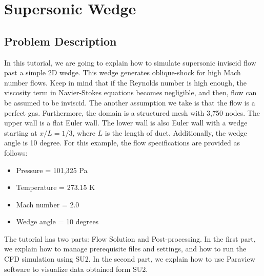 \chapter{Supersonic Wedge}
\section{Problem Description}
In this tutorial, we are going to explain how to simulate supersonic inviscid flow past a simple 2D wedge. This wedge generates oblique-shock for high Mach number flows. Keep in mind that if the Reynolds number is high enough, the viscosity term in Navier-Stokes equations becomes negligible, and then, flow can be assumed to be inviscid. The another assumption we take is that the flow is a perfect gas. Furthermore, the domain is a structured mesh with 3,750 nodes. The upper wall is a flat Euler wall. The lower wall is also Euler wall with a wedge starting at $x/L=1/3$, where $L$ is the length of duct. Additionally, the wedge angle is 10 degree. For this example, the flow specifications are provided as follows:
\begin{itemize}
    \item Pressure = 101,325 Pa
    \item Temperature = 273.15 K
    \item Mach number = 2.0
    \item Wedge angle = 10 degrees
\end{itemize}
The tutorial has two parts: Flow Solution and Post-processing. In the first part, we explain how to manage prerequisite files and settings, and how to run the CFD simulation using SU2. In the second part, we explain how to use Paraview software to visualize data obtained form SU2.
